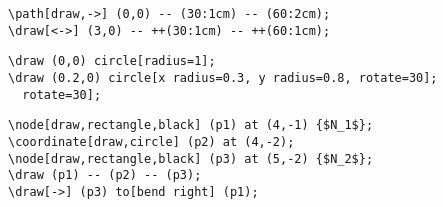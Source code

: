 \begin{frame}[fragile]
  \begin{verbatim}
\path[draw,->] (0,0) -- (30:1cm) -- (60:2cm);
\draw[<->] (3,0) -- ++(30:1cm) -- ++(60:1cm);
  \end{verbatim}
  \begin{center}
  \end{center}
\end{frame}

\begin{frame}[fragile]
  \begin{verbatim}
\draw (0,0) circle[radius=1];
\draw (0.2,0) circle[x radius=0.3, y radius=0.8, rotate=30];
  rotate=30];
  \end{verbatim}
  \begin{center}
  \end{center}
\end{frame}

\begin{frame}[fragile]
  \begin{verbatim}
\node[draw,rectangle,black] (p1) at (4,-1) {$N_1$};
\coordinate[draw,circle] (p2) at (4,-2);
\node[draw,rectangle,black] (p3) at (5,-2) {$N_2$};
\draw (p1) -- (p2) -- (p3);
\draw[->] (p3) to[bend right] (p1);
  \end{verbatim}
  \begin{center}
  \end{center}
\end{frame}

